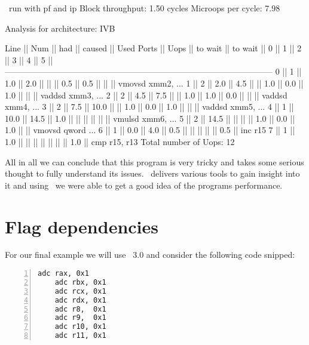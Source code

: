 \begin{LabeledExample}{\suaca\ run with pf and ip}{\label{ex:deponly}}
    Block throughput: 1.50 cycles
    Microops per cycle: 7.98
    
    Analysis for architecture: IVB
    
     Line  ||   Num   ||   had   || caused  ||            Used Ports
           ||   Uops  || to wait || to wait ||   0   ||   1   ||   2   ||   3   ||   4   ||   5   ||
     ------------------------------------------------------------------------------------------------
       0   ||    1    ||   1.0   ||   2.0   ||       ||       ||  0.5  ||  0.5  ||       ||       || vmovsd xmm2, ...
       1   ||    2    ||   2.0   ||   4.5   ||       ||  1.0  ||  0.0  ||  1.0  ||       ||       || vaddsd xmm3, ...
       2   ||    2    ||   4.5   ||   7.5   ||       ||  1.0  ||  1.0  ||  0.0  ||       ||       || vaddsd xmm4, ...
       3   ||    2    ||   7.5   ||  10.0   ||       ||  1.0  ||  0.0  ||  1.0  ||       ||       || vaddsd xmm5, ...
       4   ||    1    ||  10.0   ||  14.5   ||  1.0  ||       ||       ||       ||       ||       || vmulsd xmm6, ...
       5   ||    2    ||  14.5   ||         ||       ||       ||  1.0  ||  0.0  ||  1.0  ||       || vmovsd qword ...
       6   ||    1    ||   0.0   ||   4.0   ||  0.5  ||       ||       ||       ||       ||  0.5  || inc r15
       7   ||    1    ||   1.0   ||         ||       ||       ||       ||       ||       ||  1.0  || cmp r15, r13
    Total number of Uops: 12
\end{LabeledExample}


All in all we can conclude that this program is very tricky and takes some serious thought to fully understand its issues. \suaca\ delivers various tools to gain insight into it and using \suaca\ we were able to get a good idea of the programs performance.


\section{Flag dependencies}

For our final example we will use \iaca\ $3.0$ and consider the following code snipped:

\begin{mdframed}[backgroundcolor=light-gray, roundcorner=10pt,leftmargin=1, rightmargin=1, innerleftmargin=15, innertopmargin=1,innerbottommargin=1, outerlinewidth=1, linecolor=light-gray]
    \begin{lstlisting}[language={myLang}, basicstyle=\small, numbers=left]
    adc rax, 0x1
    adc rbx, 0x1
    adc rcx, 0x1
    adc rdx, 0x1
    adc r8,  0x1
    adc r9,  0x1
    adc r10, 0x1
    adc r11, 0x1
    \end{lstlisting}
\end{mdframed}

